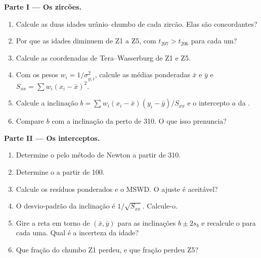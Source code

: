 \begin{problem}
\medskip\noindent\textbf{Parte I --- Os zircões.}
\begin{enumerate}
\item Calcule as duas idades urânio--chumbo de cada zircão. Elas são concordantes?
\item Por que as idades diminuem de Z1 a Z5, com $t_{207} > t_{206}$ para
cada um?
\item Calcule as coordenadas de Tera--Wasserburg de Z1 e Z5.
\item Com os pesos $w_i = 1/\sigma_{y,i}^2$, calcule as médias ponderadas
$\bar x$ e $\bar y$ e $S_{xx} = \sum w_i(x_i - \bar x)^2$.
\item Calcule a inclinação $b = \sum w_i(x_i - \bar x)(y_i - \bar y)/S_{xx}$ e
o intercepto $a$ da .
\item Compare $b$ com a inclinação da  perto de \qty{310}{\Ma}. O que
isso prenuncia?
\end{enumerate}

\medskip\noindent\textbf{Parte II --- Os interceptos.}
\begin{enumerate}[resume]
\item Determine o  pelo método de Newton a partir de \qty{310}{\Ma}.
\item Determine o  a partir de \qty{100}{\Ma}.
\item Calcule os resíduos ponderados e o MSWD. O ajuste é aceitável?
\item O desvio-padrão da inclinação é $1/\sqrt{S_{xx}}$. Calcule-o.
\item Gire a reta em torno de $(\bar x, \bar y)$ para as inclinações $b \pm 2s_b$ e
recalcule o  para cada uma. Qual é a incerteza da idade?
\item Que fração do chumbo Z1 perdeu, e que fração perdeu Z5?
\end{enumerate}


\end{problem}
